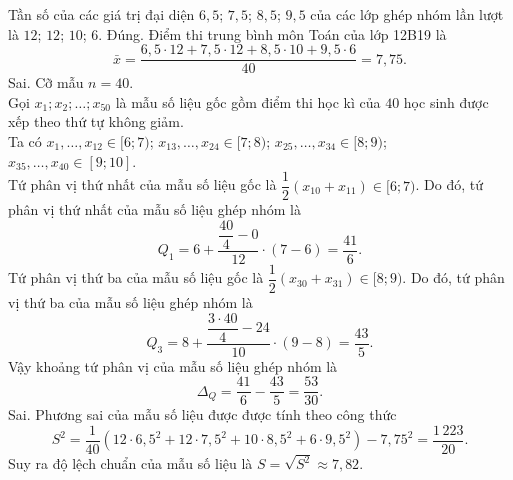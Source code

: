 \begin{ex}
{\begin{itemchoice}
		Tần số của các giá trị đại diện $6{,}5$; $7{,}5$; $8{,}5$; $9{,}5$ của các lớp ghép nhóm lần lượt là $12$; $12$; $10$; $6$.
			\itemch Đúng. Điểm thi trung bình môn Toán của lớp 12B19 là
			$$\bar{x}=\dfrac{6{,}5\cdot12+7{,}5\cdot12+8{,}5\cdot10+9{,}5\cdot6}{40}=7{,}75.$$
			\itemch Sai.
			Cỡ mẫu $n=40$.\\
			Gọi $x_1 ; x_2 ; \ldots ; x_{50}$ là mẫu số liệu gốc gồm điểm thi học kì của $40$ học sinh được xếp theo thứ tự không giảm.\\
			Ta có $x_1,\ldots, x_{12} \in[6;7)$; $x_{13}, \ldots, x_{24} \in[7;8)$; $x_{25}, \ldots, x_{34} \in[8;9)$; $x_{35}, \ldots, x_{40} \in[9;10]$.\\
			Tứ phân vị thứ nhất của mẫu số liệu gốc là $\dfrac{1}{2}\left(x_{10}+x_{11}\right) \in[6;7)$. Do đó, tứ phân vị thứ nhất của mẫu số liệu ghép nhóm là
			$$
			Q_1=6+\dfrac{\dfrac{40}{4}-0}{12} \cdot(7-6)=\dfrac{41}{6}.
			$$			
			Tứ phân vị thứ ba của mẫu số liệu gốc là $\dfrac{1}{2}\left(x_{30}+x_{31}\right) \in[8;9)$. Do đó, tứ phân vị thứ ba của mẫu số liệu ghép nhóm là
			$$
			Q_3=8+\dfrac{\dfrac{3\cdot40}{4}-24}{10} \cdot(9-8)=\dfrac{43}{5}.
			$$			
			Vậy khoảng tứ phân vị của mẫu số liệu ghép nhóm là
			$$
			\Delta_Q=\dfrac{41}{6}-\dfrac{43}{5}=\dfrac{53}{30}.
			$$
			\itemch Sai. Phương sai của mẫu số liệu được được tính theo công thức
			$$S^2=\dfrac{1}{40}\left(12\cdot6{,}5^2+12\cdot7{,}5^2+10\cdot8{,}5^2+6\cdot9{,}5^2\right)-7{,}75^2=\dfrac{1\,223}{20}.$$
			Suy ra độ lệch chuẩn của mẫu số liệu là $S=\sqrt{S^2}\approx 7{,}82$.
		\end{itemchoice}
	}
\end{ex}


